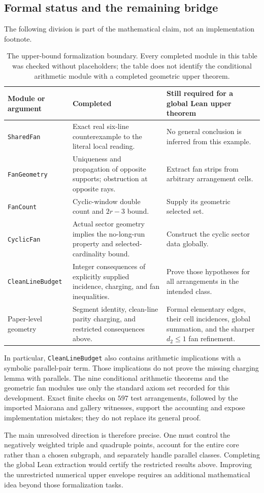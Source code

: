 \subsection{Formal status and the remaining bridge}

The following division is part of the mathematical claim, not an implementation footnote.
\begin{table}[htbp]
\centering\small
\begin{tabularx}{\textwidth}{@{}lXX@{}}
\toprule
Module or argument & Completed & Still required for a global Lean upper theorem\\
\midrule
\texttt{SharedFan} & Exact real six-line counterexample to the literal local reading. & No general conclusion is inferred from this example.\\
\texttt{FanGeometry} & Uniqueness and propagation of opposite supports; obstruction at opposite rays. & Extract fan strips from arbitrary arrangement cells.\\
\texttt{FanCount} & Cyclic-window double count and $2r-3$ bound. & Supply its geometric selected set.\\
\texttt{CyclicFan} & Actual sector geometry implies the no-long-run property and selected-cardinality bound. & Construct the cyclic sector data globally.\\
\texttt{CleanLineBudget} & Integer consequences of explicitly supplied incidence, charging, and fan inequalities. & Prove those hypotheses for all arrangements in the intended class.\\
Paper-level geometry & Segment identity, clean-line parity charging, and restricted consequences above. & Formal elementary edges, their cell incidences, global summation, and the sharper $d_2\le1$ fan refinement.\\
\bottomrule
\end{tabularx}
\caption{The upper-bound formalization boundary. Every completed module in this table was checked without placeholders; the table does not identify the conditional arithmetic module with a completed geometric upper theorem.}
\label{upper:formal-status}
\end{table}

In particular, \texttt{CleanLineBudget} also contains arithmetic implications with a symbolic parallel-pair term. Those implications do not prove the missing charging lemma with parallels. The nine conditional arithmetic theorems and the geometric fan modules use only the standard axiom set recorded for this development. Exact finite checks on $597$ test arrangements, followed by the imported Maiorana and gallery witnesses, support the accounting and expose implementation mistakes; they do not replace its general proof.

The main unresolved direction is therefore precise. One must control the negatively weighted triple and quadruple points, account for the entire core rather than a chosen subgraph, and separately handle parallel classes. Completing the global Lean extraction would certify the restricted results above. Improving the unrestricted numerical upper envelope requires an additional mathematical idea beyond those formalization tasks.
